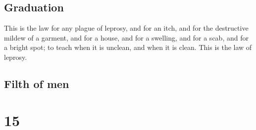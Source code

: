 \hypertarget{graduation}{%
\subsection{Graduation}\label{graduation}}

 This is the law for any plague of leprosy, and for an
itch,  and for the destructive mildew of a garment, and
for a house,  and for a swelling, and for a scab, and for
a bright spot;  to teach when it is unclean, and when it
is clean. This is the law of leprosy.

\hypertarget{filth-of-men}{%
\subsection{Filth of men}\label{filth-of-men}}

\hypertarget{section-14}{%
\section{15}\label{section-14}}

